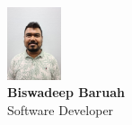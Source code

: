 \documentclass[10pt,a4paper]{article}
\begin{document}
\pagestyle{empty}

\begin{center}
    \includegraphics[width=0.12\textwidth,height=0.12\textwidth,keepaspectratio,clip]{passport_photo.jpeg} \\
    \vspace{3mm}
    {\Huge \textbf{Biswadeep Baruah}} \\
    \vspace{2mm}
    {\Large \color{titlegrey} Software Developer}
\end{center}
\vspace{5mm}
\end{document}
